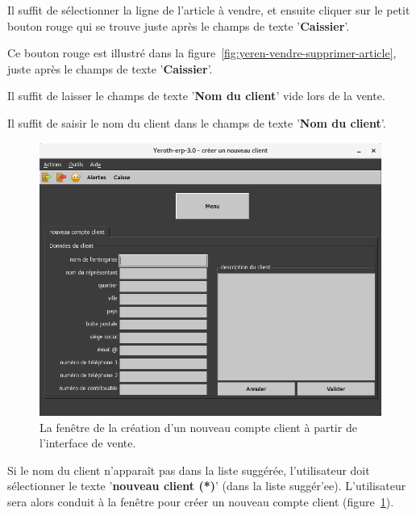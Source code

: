 Il suffit de s\'electionner la ligne de l'article \`a vendre,
et ensuite cliquer sur le petit bouton rouge qui se trouve
juste apr\`es le champs de texte '\textbf{Caissier}'.

Ce bouton rouge est illustr\'e dans la figure~\ref{fig:yeren-vendre-supprimer-article},
juste apr\`es le champs de texte '\textbf{Caissier}'.
	
\newpage
{}\label{sec:vendre-client-divers}

Il suffit de laisser le champs de texte '\textbf{Nom du client}'
vide lors de la vente.


\label{sec:vendre-client-nomme}

Il suffit de saisir le nom du client dans le champs de
texte '\textbf{Nom du client}'.

\begin{figure}[!htbp]
	\centering
	\includegraphics[scale=0.63]{images/yeren-vente-creer-nouveau-client.png}
	\caption{La fen\^etre de la cr\'eation d'un nouveau compte
		client \`a partir de l'interface de vente.}
	\label{fig:yeren-vente-creer-nouveau-client}
\end{figure}

Si le nom du client n'appara\^it pas dans la liste
sugg\'er\'ee, l'utilisateur doit s\'electionner le texte
'\textbf{nouveau client (*)}' (dans la liste sugg\'er'ee).
L'utilisateur sera alors conduit \`a la fen\^etre
pour cr\'eer un nouveau compte client
(figure~\ref{fig:yeren-vente-creer-nouveau-client}).

